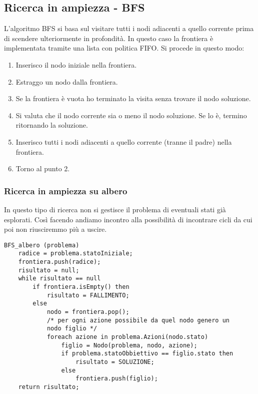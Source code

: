 \subsection{Ricerca in ampiezza - BFS}
L'algoritmo BFS si basa sul visitare tutti i nodi adiacenti a quello corrente prima di
scendere ulteriormente in profondit\`a. In questo caso la frontiera \`e implementata
tramite una lista con politica FIFO. Si procede in questo modo:
\begin{enumerate}
	\item Inserisco il nodo iniziale nella frontiera.
	\item Estraggo un nodo dalla frontiera.
	\item Se la frontiera \`e vuota ho terminato la visita senza trovare il nodo soluzione.
	\item Si valuta che il nodo corrente sia o meno il nodo soluzione. Se lo \`e, termino
	      ritornando la soluzione.
	\item Inserisco tutti i nodi adiacenti a quello corrente (tranne il padre) nella
	      frontiera.
	\item Torno al punto 2.
\end{enumerate}

\subsubsection{Ricerca in ampiezza su albero}
In questo tipo di ricerca non si gestisce il problema di eventuali stati gi\`a esplorati.
Cos\`i facendo andiamo incontro alla possibilit\`a di incontrare cicli da cui poi non
riusciremmo pi\`u a uscire.
\begin{lstlisting}[style=pseudo-style]
BFS_albero (problema)
	radice = problema.statoIniziale;
	frontiera.push(radice);
	risultato = null;
	while risultato == null
		if frontiera.isEmpty() then
			risultato = FALLIMENTO;
		else
			nodo = frontiera.pop();
			/* per ogni azione possibile da quel nodo genero un 
			nodo figlio */
			foreach azione in problema.Azioni(nodo.stato)
				figlio = Nodo(problema, nodo, azione);
				if problema.statoObbiettivo == figlio.stato then
					risultato = SOLUZIONE;
				else
					frontiera.push(figlio);
	return risultato;
\end{lstlisting}

